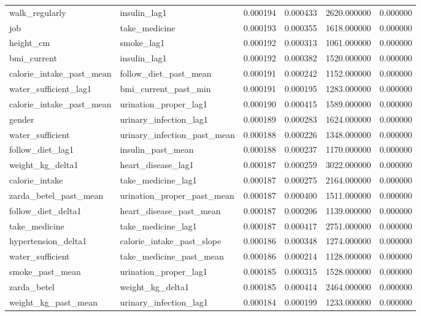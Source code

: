 \begin{longtable}{llrrrr}
walk\_regularly & insulin\_lag1 & 0.000194 & 0.000433 & 2620.000000 & 0.000000 \\
job & take\_medicine & 0.000193 & 0.000355 & 1618.000000 & 0.000000 \\
height\_cm & smoke\_lag1 & 0.000192 & 0.000313 & 1061.000000 & 0.000000 \\
bmi\_current & insulin\_lag1 & 0.000192 & 0.000382 & 1520.000000 & 0.000000 \\
calorie\_intake\_past\_mean & follow\_diet\_past\_mean & 0.000191 & 0.000242 & 1152.000000 & 0.000000 \\
water\_sufficient\_lag1 & bmi\_current\_past\_min & 0.000191 & 0.000195 & 1283.000000 & 0.000000 \\
calorie\_intake\_past\_mean & urination\_proper\_lag1 & 0.000190 & 0.000415 & 1589.000000 & 0.000000 \\
gender & urinary\_infection\_lag1 & 0.000189 & 0.000283 & 1624.000000 & 0.000000 \\
water\_sufficient & urinary\_infection\_past\_mean & 0.000188 & 0.000226 & 1348.000000 & 0.000000 \\
follow\_diet\_lag1 & insulin\_past\_mean & 0.000188 & 0.000237 & 1170.000000 & 0.000000 \\
weight\_kg\_delta1 & heart\_disease\_lag1 & 0.000187 & 0.000259 & 3022.000000 & 0.000000 \\
calorie\_intake & take\_medicine\_lag1 & 0.000187 & 0.000275 & 2164.000000 & 0.000000 \\
zarda\_betel\_past\_mean & urination\_proper\_past\_mean & 0.000187 & 0.000400 & 1511.000000 & 0.000000 \\
follow\_diet\_delta1 & heart\_disease\_past\_mean & 0.000187 & 0.000206 & 1139.000000 & 0.000000 \\
take\_medicine & take\_medicine\_lag1 & 0.000187 & 0.000417 & 2751.000000 & 0.000000 \\
hypertension\_delta1 & calorie\_intake\_past\_slope & 0.000186 & 0.000348 & 1274.000000 & 0.000000 \\
water\_sufficient & take\_medicine\_past\_mean & 0.000186 & 0.000214 & 1128.000000 & 0.000000 \\
smoke\_past\_mean & urination\_proper\_lag1 & 0.000185 & 0.000315 & 1528.000000 & 0.000000 \\
zarda\_betel & weight\_kg\_delta1 & 0.000185 & 0.000414 & 2464.000000 & 0.000000 \\
weight\_kg\_past\_mean & urinary\_infection\_lag1 & 0.000184 & 0.000199 & 1233.000000 & 0.000000 \\

\end{longtable}

